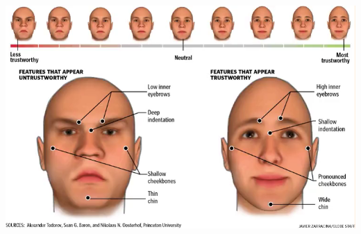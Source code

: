 \documentclass[aspectratio=169,usenames,dvipsnames]{beamer}
\begin{document}
\begin{frame}

\begin{center}
\includegraphics[height=0.95\textheight, keepaspectratio]{images/trustworthiness}
\pause


\end{center}
\end{frame}
\end{document}
